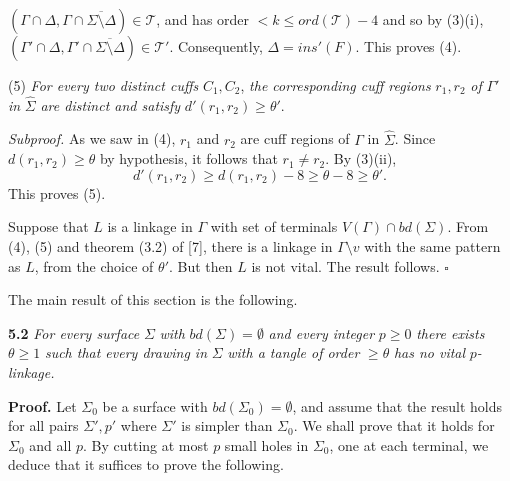 \noindent $(\Gamma \cap \Delta, \Gamma \cap \overline{\Sigma \setminus \Delta}) \in \mathcal{T}$, and has order $< k \le ord(\mathcal{T}) - 4$ and so by (3)(i), $(\Gamma' \cap \Delta, \Gamma' \cap \overline{\Sigma \setminus \Delta}) \in \mathcal{T}'$. Consequently, $\Delta = ins'(F)$. This proves (4).

\hspace*{12pt}(5) \textit{For every two distinct cuffs} $C_1, C_2$, \textit{the corresponding cuff regions} $r_1, r_2$ \textit{of} $\Gamma'$ \textit{in} $\hat{\Sigma}$ \textit{are distinct and satisfy} $d'(r_1, r_2) \ge \theta'$.

\textit{Subproof.} As we saw in (4), $r_1$ and $r_2$ are cuff regions of $\Gamma$ in $\hat{\Sigma}$. Since $d(r_1, r_2) \ge \theta$ by hypothesis, it follows that $r_1 \ne r_2$. By (3)(ii),
\begin{equation*}
d'(r_1, r_2) \ge d(r_1, r_2) - 8 \ge \theta - 8 \ge \theta'.
\end{equation*}
This proves (5).

Suppose that $L$ is a linkage in $\Gamma$ with set of terminals $V(\Gamma) \cap bd(\Sigma)$. From (4), (5) and theorem (3.2) of [7], there is a linkage in $\Gamma \setminus v$ with the same pattern as $L$, from the choice of $\theta'$. But then $L$ is not vital. The result follows. $\square$

The main result of this section is the following.

\textbf{5.2} \textit{For every surface} $\Sigma$ \textit{with} $bd(\Sigma) = \emptyset$ \textit{and every integer} $p \ge 0$ \textit{there exists} $\theta \ge 1$ \textit{such that every drawing in} $\Sigma$ \textit{with a tangle of order} $\ge \theta$ \textit{has no vital} $p$\textit{-linkage.}

\textbf{Proof.} Let $\Sigma_0$ be a surface with $bd(\Sigma_0) = \emptyset$, and assume that the result holds for all pairs $\Sigma', p'$ where $\Sigma'$ is simpler than $\Sigma_0$. We shall prove that it holds for $\Sigma_0$ and all $p$. By cutting at most $p$ small holes in $\Sigma_0$, one at each terminal, we deduce that it suffices to prove the following.

